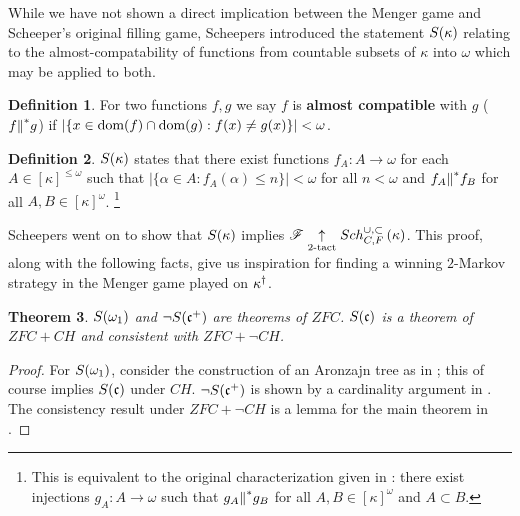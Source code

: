 \documentclass{amsart}
\newtheorem{theorem}{Theorem}[section]
\theoremstyle{definition}
\newtheorem{definition}[theorem]{Definition}
\begin{document}
While we have not shown a direct implication between the Menger game and
Scheeper's original filling game, Scheepers introduced the statement
\(S(\kappa)\) relating to the almost-compatability of functions
from countable subsets of \(\kappa\) into \(\omega\) which may be applied to
both.

\begin{definition}
  For two functions \(f,g\) we say \(f\) is \textbf{almost compatible} with
  \(g\) (\(f{\parallel}^* g\)) if \(|\{x\in\textrm{dom}(f)\cap\textrm{dom}(g):f(x)\not=g(x)\}|<\omega\).
\end{definition}

\begin{definition}
  \(S(\kappa)\) states that there exist functions
  \(f_A:A\to\omega\) for each \(A\in[\kappa]^{\leq\omega}\) such that
  \(|\{\alpha\in A:f_A(\alpha)\leq n\}|<\omega\) for all \(n<\omega\) and
  \(f_A{\parallel}^* f_B\) for all \(A,B\in[\kappa]^\omega\).
  \footnote{
  This is equivalent to the original characterization given in
  \cite{MR1129143}: there exist injections \(g_A:A\to\omega\)
  such that \(g_A{\parallel}^* g_B\) for all \(A,B\in[\kappa]^\omega\) and \(A\subset B\).
  }
\end{definition}

Scheepers went on to show that \(S(\kappa)\) implies
\(\mathscr{F} \underset{2\text{-tact}}{\uparrow} Sch^{\cup,\subset}_{C,F}\left({\kappa}\right)\). This proof, along with the following
facts, give us inspiration for
finding a winning \(2\)-Markov strategy in the Menger game played on
\(\kappa^\dagger\).

\begin{theorem}
  \(S(\omega_1)\) and \(\neg S(\mathfrak{c}^+)\)
  are theorems of \(ZFC\).
  \(S(\mathfrak{c})\) is a theorem of \(ZFC+CH\) and consistent with
  \(ZFC+\neg CH\).
\end{theorem}

\begin{proof}
  For \(S(\omega_1)\), consider the construction of an Aronzajn tree
  as in \cite{MR597342}; this of course
  implies \(S(\mathfrak{c})\) under \(CH\).
  \(\neg S(\mathfrak{c}^+)\) is shown by a cardinality argument
  in \cite{MR1129143}.
  The consistency result under \(ZFC+\neg CH\)
  is a lemma for the main theorem in \cite{MR1129143}.
\end{proof}
\end{document}
